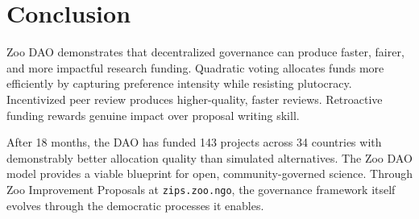 \section{Conclusion}

\label{sec:conclusion}

Zoo DAO demonstrates that decentralized governance can produce faster,
fairer, and more impactful research funding. Quadratic voting allocates
funds more efficiently by capturing preference intensity while resisting
plutocracy. Incentivized peer review produces higher-quality, faster
reviews. Retroactive funding rewards genuine impact over proposal writing
skill.

After 18 months, the DAO has funded 143 projects across 34 countries with
demonstrably better allocation quality than simulated alternatives. The
Zoo DAO model provides a viable blueprint for open, community-governed
science. Through Zoo Improvement Proposals at \texttt{zips.zoo.ngo}, the
governance framework itself evolves through the democratic processes it
enables.





